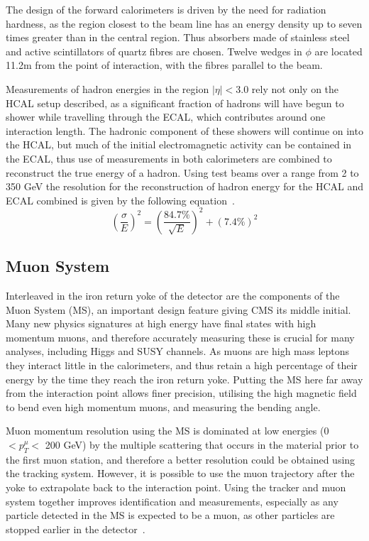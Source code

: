 The design of the forward calorimeters is driven by the need for radiation hardness, as the region closest to the beam line has an energy density up to seven times greater than in the central region. Thus absorbers made of stainless steel and active scintillators of quartz fibres are chosen. Twelve wedges in $\phi$ are located 11.2m from the point of interaction, with the fibres parallel to the beam.

Measurements of hadron energies in the region $| \eta| < 3.0$ rely not only on the HCAL setup described, as a significant fraction of hadrons will have begun to shower while travelling through the ECAL, which contributes around one interaction length.  The hadronic component of these showers will continue on into the HCAL, but much of the initial electromagnetic activity can be contained in the ECAL, thus use of measurements in both calorimeters are combined to reconstruct the true energy of a hadron. Using test beams over a range from 2 to 350 GeV the resolution for the reconstruction of hadron energy for the HCAL and ECAL combined is given by the following equation~\cite{HCALTestBeam}.
\begin{equation} 
\left(\frac{\sigma}{E}\right)^2 = \left(\frac{84.7\%}{\sqrt{E}}\right)^2 + \left(7.4\% \right)^2 
\label{eq:H-Res}
\end{equation}


\subsection{Muon System}

Interleaved in the iron return yoke of the detector are the components of the Muon System (MS), an important design feature giving CMS its middle initial. Many new physics signatures at high energy have final states with high momentum muons, and therefore accurately measuring these is crucial for many analyses, including Higgs and SUSY channels. As muons are high mass leptons they interact little in the calorimeters, and thus retain a high percentage of their energy by the time they reach the iron return yoke. Putting the MS here far away from the interaction point allows finer precision, utilising the high magnetic field to bend even high momentum muons, and measuring the bending angle.

Muon momentum resolution using the MS is dominated at low energies (0 $< p^{\mu}_{T} < $ 200 GeV) by the multiple scattering that occurs in the material prior to the first muon station, and therefore a better resolution could be obtained using the tracking system. However, it is possible to use the muon trajectory after the yoke to extrapolate back to the interaction point. Using the tracker and muon system together improves identification and measurements, especially as any particle detected in the MS is expected to be a muon, as other particles are stopped earlier in the detector~\cite{MuonTDR}. 

